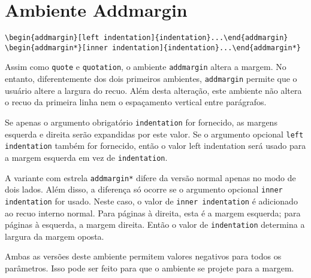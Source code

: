 \chapter{Ambiente Addmargin}

\begin{verbatim}
\begin{addmargin}[left indentation]{indentation}...\end{addmargin}
\begin{addmargin*}[inner indentation]{indentation}...\end{addmargin*}
\end{verbatim}

Assim como \texttt{quote} e \texttt{quotation}, o ambiente \texttt{addmargin} altera a margem. No entanto, diferentemente dos dois primeiros ambientes, \texttt{addmargin} permite que o usuário altere a largura do recuo. Além desta alteração, este ambiente não altera o recuo da primeira linha nem o espaçamento vertical entre parágrafos.

Se apenas o argumento obrigatório \texttt{indentation} for fornecido, as margens esquerda e direita serão expandidas por este valor. Se o argumento opcional \texttt{left indentation} também for fornecido, então o valor left indentation será usado para a margem esquerda em vez de \texttt{indentation}.

A variante com estrela \texttt{addmargin*} difere da versão normal apenas no modo de dois lados. Além disso, a diferença só ocorre se o argumento opcional \texttt{inner indentation} for usado. Neste caso, o valor de \texttt{inner indentation} é adicionado ao recuo interno normal. Para páginas à direita, esta é a margem esquerda; para páginas à esquerda, a margem direita. Então o valor de \texttt{indentation} determina a largura da margem oposta.

Ambas as versões deste ambiente permitem valores negativos para todos os parâmetros. Isso pode ser feito para que o ambiente se projete para a margem.
